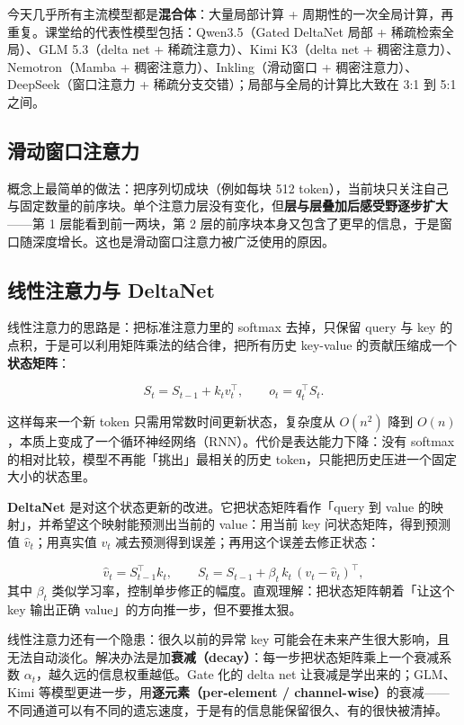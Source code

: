 \documentclass[a4paper]{article}
\begin{document}
今天几乎所有主流模型都是\textbf{混合体}：大量局部计算 + 周期性的一次全局计算，再重复。课堂给的代表性模型包括：Qwen3.5（Gated DeltaNet 局部 + 稀疏检索全局）、GLM 5.3（delta net + 稀疏注意力）、Kimi K3（delta net + 稠密注意力）、Nemotron（Mamba + 稠密注意力）、Inkling（滑动窗口 + 稠密注意力）、DeepSeek（窗口注意力 + 稀疏分支交错）；局部与全局的计算比大致在 3:1 到 5:1 之间。

\subsection{滑动窗口注意力}

概念上最简单的做法：把序列切成块（例如每块 512 token），当前块只关注自己与固定数量的前序块。单个注意力层没有变化，但\textbf{层与层叠加后感受野逐步扩大}——第 1 层能看到前一两块，第 2 层的前序块本身又包含了更早的信息，于是窗口随深度增长。这也是滑动窗口注意力被广泛使用的原因。

\subsection{线性注意力与 DeltaNet}

线性注意力的思路是：把标准注意力里的 softmax 去掉，只保留 query 与 key 的点积，于是可以利用矩阵乘法的结合律，把所有历史 key-value 的贡献压缩成一个\textbf{状态矩阵}：

$$
S_t = S_{t-1} + k_t v_t^{\top},\qquad o_t = q_t^{\top} S_t .
$$

这样每来一个新 token 只需用常数时间更新状态，复杂度从 $O(n^2)$ 降到 $O(n)$，本质上变成了一个循环神经网络（RNN）。代价是表达能力下降：没有 softmax 的相对比较，模型不再能「挑出」最相关的历史 token，只能把历史压进一个固定大小的状态里。

\textbf{DeltaNet} 是对这个状态更新的改进。它把状态矩阵看作「query 到 value 的映射」，并希望这个映射能预测出当前的 value：用当前 key 问状态矩阵，得到预测值 $\hat v_t$；用真实值 $v_t$ 减去预测得到误差；再用这个误差去修正状态：

$$
\hat v_t = S_{t-1}^{\top} k_t,\qquad
S_t = S_{t-1} + \beta_t\, k_t\,(v_t - \hat v_t)^{\top},
$$
其中 $\beta_t$ 类似学习率，控制单步修正的幅度。直观理解：把状态矩阵朝着「让这个 key 输出正确 value」的方向推一步，但不要推太狠。

线性注意力还有一个隐患：很久以前的异常 key 可能会在未来产生很大影响，且无法自动淡化。解决办法是加\textbf{衰减（decay）}：每一步把状态矩阵乘上一个衰减系数 $\alpha_t$，越久远的信息权重越低。Gate 化的 delta net 让衰减是学出来的；GLM、Kimi 等模型更进一步，用\textbf{逐元素（per-element / channel-wise）}的衰减——不同通道可以有不同的遗忘速度，于是有的信息能保留很久、有的很快被清掉。
\end{document}
